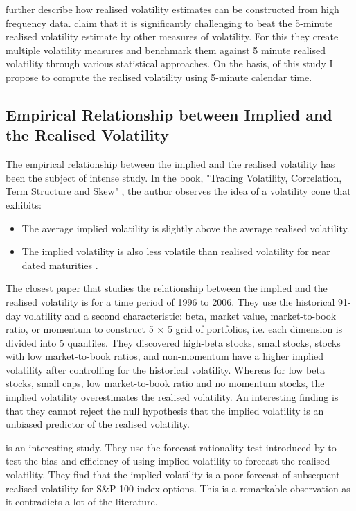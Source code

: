 \cite{Corsi2005} further describe how realised volatility estimates can be constructed from high frequency data. \cite{liu2012comparison} claim that it is significantly challenging to beat the 5-minute realised volatility estimate by other measures of volatility. For this they create multiple volatility measures and benchmark them against 5 minute realised volatility through various statistical approaches. On the basis, of this study I propose to compute the realised volatility using 5-minute calendar time.

\subsection{Empirical Relationship between Implied and the Realised Volatility}

The empirical relationship between the implied and the realised volatility has been the subject of intense study. In the book, "Trading Volatility, Correlation, Term Structure and Skew" \cite{bennett2020trading}, the author observes the idea of a volatility cone that exhibits:
\begin{itemize}
	\item The average implied volatility is slightly above the average realised volatility.
	\item The implied volatility is also less volatile than realised volatility for near dated maturities .
\end{itemize}

The closest paper that studies the relationship between the implied and the realised volatility is \cite{ammann2009implied} for a time period of 1996 to 2006. They use the historical 91-day volatility and a second characteristic: beta, market value, market-to-book ratio, or momentum to construct 5 $\times$ 5 grid of portfolios, i.e. each dimension is divided into 5 quantiles. They discovered high-beta stocks, small stocks, stocks with low market-to-book ratios, and non-momentum have a higher implied volatility after controlling for the historical volatility. Whereas for low beta stocks, small caps, low market-to-book ratio and no momentum stocks, the implied volatility overestimates the realised volatility.  An interesting finding is that they cannot reject the null hypothesis that the implied volatility is an unbiased predictor of the realised volatility.

\cite{canina1993} is an interesting study. They use the forecast rationality test introduced by \cite{theil1966} to test the bias and efficiency of using implied volatility to forecast the realised volatility. They find that the implied volatility is a poor forecast of subsequent realised volatility for S\&P 100 index options. This is a remarkable observation as it contradicts a lot of the literature.

